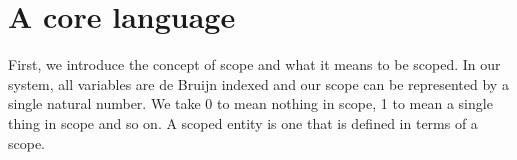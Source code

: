 \section{A core language}
\label{section-corelanguage}


First, we introduce the concept of scope and what it means to be
scoped. In our system, all variables are de Bruijn indexed and our
scope can be represented by a single natural number. We take 0 to
mean nothing in scope, 1 to mean a single thing in scope and so on. A
scoped entity is one that is defined in terms of a scope.

\begin{code}%
\>[0]%
\>[7]\AgdaSymbol{=}\AgdaSpace{}%
\<%
\\
\>[0]\AgdaSpace{}%
\AgdaSymbol{=}\AgdaSpace{}%
\AgdaSpace{}%
\AgdaSpace{}%
\<%
\end{code}

